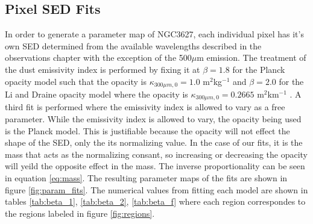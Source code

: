 \subsection{Pixel SED Fits}

In order to generate a parameter map of NGC3627, each individual pixel has it's own SED determined from the available wavelengths described in the observations chapter with the exception of the 500$\mu$m emission.  The treatment of the dust emissivity index is performed by fixing it at $\beta=1.8$ for the Planck opacity model such that the opacity is $\kappa_{300\mu m,0}=1.0$ m$^2$kg$^{-1}$ \citep{planck252011} and $\beta=2.0$ for the Li and Draine opacity model where the opacity is $\kappa_{300\mu m,0}=0.2665$ m$^2$km$^{-1}$ \citep{li2001}.  A third fit is performed where the emissivity index is allowed to vary as a free parameter.  While the emissivity index is allowed to vary, the opacity being used is the Planck model.  This is justifiable because the opacity will not effect the shape of the SED, only the its normalizing value.  In the case of our fits, it is the mass that acts as the normalizing consant, so increasing or decreasing the opacity will yeild the opposite effect in the mass.  The inverse proportionality can be seen in equation \ref{eq:mass}.  The resulting parameter maps of the fits are shown in figure \ref{fig:param_fits}. The numerical values from fitting each model are shown in tables \ref{tab:beta_1}, \ref{tab:beta_2}, \ref{tab:beta_f} where each region correspondes to the regions labeled in figure \ref{fig:regions}.


